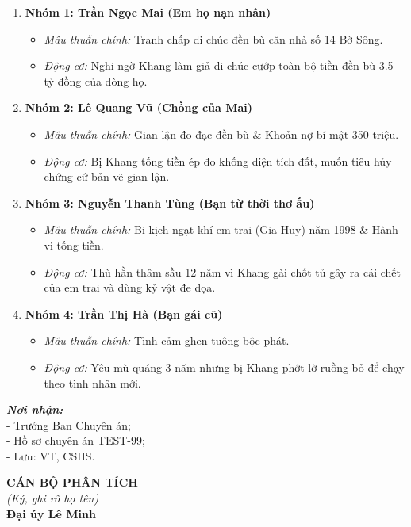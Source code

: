 \documentclass[12pt,a4paper]{article}
\begin{document}
\begin{enumerate}[label=\arabic*., leftmargin=1.5cm]
    \item \textbf{Nhóm 1: Trần Ngọc Mai (Em họ nạn nhân)}
    \begin{itemize}[leftmargin=0.8cm]
        \item \textit{Mâu thuẫn chính:} Tranh chấp di chúc đền bù căn nhà số 14 Bờ Sông.
        \item \textit{Động cơ:} Nghi ngờ Khang làm giả di chúc cướp toàn bộ tiền đền bù 3.5 tỷ đồng của dòng họ.
    \end{itemize}

    \item \textbf{Nhóm 2: Lê Quang Vũ (Chồng của Mai)}
    \begin{itemize}[leftmargin=0.8cm]
        \item \textit{Mâu thuẫn chính:} Gian lận đo đạc đền bù & Khoản nợ bí mật 350 triệu.
        \item \textit{Động cơ:} Bị Khang tống tiền ép đo khống diện tích đất, muốn tiêu hủy chứng cứ bản vẽ gian lận.
    \end{itemize}

    \item \textbf{Nhóm 3: Nguyễn Thanh Tùng (Bạn từ thời thơ ấu)}
    \begin{itemize}[leftmargin=0.8cm]
        \item \textit{Mâu thuẫn chính:} Bi kịch ngạt khí em trai (Gia Huy) năm 1998 & Hành vi tống tiền.
        \item \textit{Động cơ:} Thù hằn thâm sầu 12 năm vì Khang gài chốt tủ gây ra cái chết của em trai và dùng kỷ vật đe dọa.
    \end{itemize}

    \item \textbf{Nhóm 4: Trần Thị Hà (Bạn gái cũ)}
    \begin{itemize}[leftmargin=0.8cm]
        \item \textit{Mâu thuẫn chính:} Tình cảm ghen tuông bộc phát.
        \item \textit{Động cơ:} Yêu mù quáng 3 năm nhưng bị Khang phớt lờ ruồng bỏ để chạy theo tình nhân mới.
    \end{itemize}
\end{enumerate}

\vspace{0.8cm}

\noindent
\begin{minipage}[t]{0.45\textwidth}
    \small
    \textbf{\textit{Nơi nhận:}}\\
    - Trưởng Ban Chuyên án;\\
    - Hồ sơ chuyên án TEST-99;\\
    - Lưu: VT, CSHS.
\end{minipage}
\hfill
\begin{minipage}[t]{0.5\textwidth}
    \begin{center}
        \small
        \textbf{CÁN BỘ PHÂN TÍCH}\\
        \textit{(Ký, ghi rõ họ tên)}\\[1.5cm]
        \textbf{Đại úy Lê Minh}
    \end{center}
\end{minipage}
\end{document}
